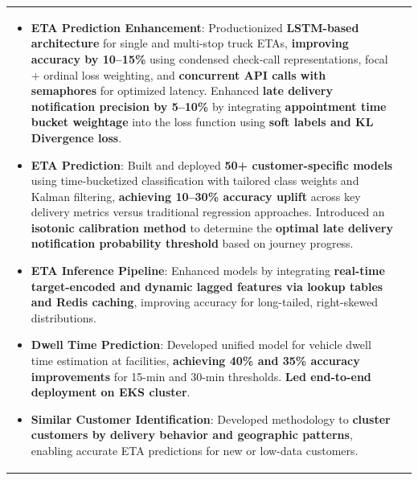 \documentclass[a4paper,11pt]{article}
\begin{document}
\begin{tabularx}{\linewidth}{ @{}l r@{} }
\begin{minipage}[t]{\linewidth}
\begin{itemize}[nosep,after=\strut, leftmargin=1em, itemsep=4pt]
        \item \textbf{ETA Prediction Enhancement}: Productionized \textbf{LSTM-based architecture} for single and multi-stop truck ETAs, \textbf{improving accuracy by 10–15\%} using condensed check-call representations, focal + ordinal loss weighting, and \textbf{concurrent API calls with semaphores} for optimized latency.
        Enhanced \textbf{late delivery notification precision by 5–10\%} by integrating \textbf{appointment time bucket weightage} into the loss function using \textbf{soft labels and KL Divergence loss}.
        \item \textbf{ETA Prediction}: Built and deployed \textbf{50+ customer-specific models} using time-bucketized classification with tailored class weights and Kalman filtering, \textbf{achieving 10–30\% accuracy uplift} across key delivery metrics versus traditional regression approaches. Introduced an \textbf{isotonic calibration method} to determine the \textbf{optimal late delivery notification probability threshold} based on journey progress.
        \item \textbf{ETA Inference Pipeline}: Enhanced models by integrating \textbf{real-time target-encoded and dynamic lagged features via lookup tables and Redis caching}, improving accuracy for long-tailed, right-skewed distributions.
        \item \textbf{Dwell Time Prediction}: Developed unified model for vehicle dwell time estimation at facilities, \textbf{achieving 40\% and 35\% accuracy improvements} for 15-min and 30-min thresholds. \textbf{Led end-to-end deployment on EKS cluster}.
        \item \textbf{Similar Customer Identification}: Developed methodology to \textbf{cluster customers by delivery behavior and geographic patterns}, enabling accurate ETA predictions for new or low-data customers.

\end{itemize}
\end{minipage}
\end{tabularx}
\end{document}
